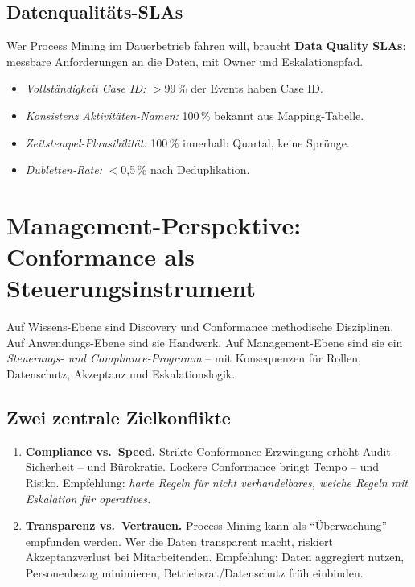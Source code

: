 \documentclass[11pt,a4paper,oneside]{article}
\newcommand{\fachbegriff}[1]{\textbf{#1}}
\begin{document}
\subsection{Datenqualitäts-SLAs}

Wer Process Mining im Dauerbetrieb fahren will, braucht \fachbegriff{Data Quality SLAs}: messbare Anforderungen an die Daten, mit Owner und Eskalationspfad.

\begin{itemize}
  \item \emph{Vollständigkeit Case ID:} $>$99\,\% der Events haben Case ID.
  \item \emph{Konsistenz Aktivitäten-Namen:} 100\,\% bekannt aus Mapping-Tabelle.
  \item \emph{Zeitstempel-Plausibilität:} 100\,\% innerhalb Quartal, keine Sprünge.
  \item \emph{Dubletten-Rate:} $<$0,5\,\% nach Deduplikation.
\end{itemize}

\section{Management-Perspektive: Conformance als Steuerungsinstrument}

Auf Wissens-Ebene sind Discovery und Conformance methodische Disziplinen. Auf Anwendungs-Ebene sind sie Handwerk. Auf Management-Ebene sind sie ein \emph{Steuerungs- und Compliance-Programm} -- mit Konsequenzen für Rollen, Datenschutz, Akzeptanz und Eskalationslogik.

\subsection{Zwei zentrale Zielkonflikte}

\begin{enumerate}
  \item \textbf{Compliance vs.\ Speed.} Strikte Conformance-Erzwingung erhöht Audit-Sicherheit -- und Bürokratie. Lockere Conformance bringt Tempo -- und Risiko. Empfehlung: \emph{harte Regeln für nicht verhandelbares, weiche Regeln mit Eskalation für operatives.}
  \item \textbf{Transparenz vs.\ Vertrauen.} Process Mining kann als ``Überwachung'' empfunden werden. Wer die Daten transparent macht, riskiert Akzeptanzverlust bei Mitarbeitenden. Empfehlung: Daten aggregiert nutzen, Personenbezug minimieren, Betriebsrat/Datenschutz früh einbinden.
\end{enumerate}
\end{document}
